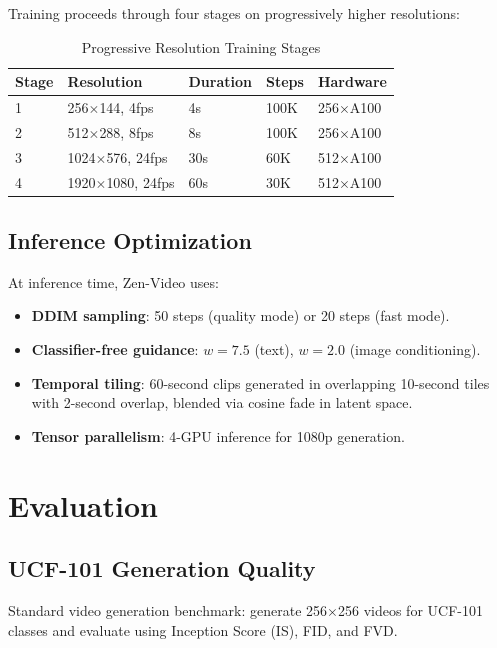\documentclass[11pt,a4paper]{article}
\begin{document}
Training proceeds through four stages on progressively higher resolutions:

\begin{table}[H]
\centering
\begin{tabular}{lllll}
\toprule
\textbf{Stage} & \textbf{Resolution} & \textbf{Duration} & \textbf{Steps} & \textbf{Hardware} \\
\midrule
1 & 256$\times$144, 4fps & 4s & 100K & 256$\times$A100 \\
2 & 512$\times$288, 8fps & 8s & 100K & 256$\times$A100 \\
3 & 1024$\times$576, 24fps & 30s & 60K & 512$\times$A100 \\
4 & 1920$\times$1080, 24fps & 60s & 30K & 512$\times$A100 \\
\bottomrule
\end{tabular}
\caption{Progressive Resolution Training Stages}
\end{table}

\subsection{Inference Optimization}

At inference time, Zen-Video uses:
\begin{itemize}
    \item \textbf{DDIM sampling}: 50 steps (quality mode) or 20 steps (fast mode).
    \item \textbf{Classifier-free guidance}: $w = 7.5$ (text), $w = 2.0$ (image conditioning).
    \item \textbf{Temporal tiling}: 60-second clips generated in overlapping 10-second tiles
    with 2-second overlap, blended via cosine fade in latent space.
    \item \textbf{Tensor parallelism}: 4-GPU inference for 1080p generation.
\end{itemize}

\section{Evaluation}

\subsection{UCF-101 Generation Quality}

Standard video generation benchmark: generate 256$\times$256 videos for UCF-101 classes and
evaluate using Inception Score (IS), FID, and FVD.
\end{document}
